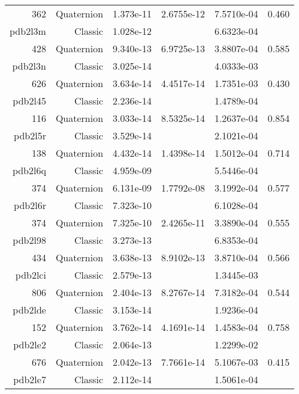 \begin{xltabular}{\textwidth}{r|rS[table-format=1.3e+2]S[table-format=1.4e+2]S[table-format=1.4e+2]S[table-format=-1.3]}
362 & Quaternion & 1.373e-11 & 2.6755e-12 & 7.5710e-04 & 0.460\\  \addlinespace
{\color{red} pdb2l3m } & Classic & 1.028e-12 &  & 6.6323e-04 & \\
428 & Quaternion & 9.340e-13 & 6.9725e-13 & 3.8807e-04 & 0.585\\  \addlinespace
{\color{red} pdb2l3n } & Classic & 3.025e-14 &  & 4.0333e-03 & \\
626 & Quaternion & 3.634e-14 & 4.4517e-14 & 1.7351e-03 & 0.430\\  \addlinespace
{\color{red} pdb2l45 } & Classic & 2.236e-14 &  & 1.4789e-04 & \\
116 & Quaternion & 3.033e-14 & 8.5325e-14 & 1.2637e-04 & 0.854\\  \addlinespace
{\color{red} pdb2l5r } & Classic & 3.529e-14 &  & 2.1021e-04 & \\
138 & Quaternion & 4.432e-14 & 1.4398e-14 & 1.5012e-04 & 0.714\\  \addlinespace
{\color{red} pdb2l6q } & Classic & 4.959e-09 &  & 5.5446e-04 & \\
374 & Quaternion & 6.131e-09 & 1.7792e-08 & 3.1992e-04 & 0.577\\  \addlinespace
{\color{red} pdb2l6r } & Classic & 7.323e-10 &  & 6.1028e-04 & \\
374 & Quaternion & 7.325e-10 & 2.4265e-11 & 3.3890e-04 & 0.555\\  \addlinespace
{\color{red} pdb2l98 } & Classic & 3.273e-13 &  & 6.8353e-04 & \\
434 & Quaternion & 3.638e-13 & 8.9102e-13 & 3.8710e-04 & 0.566\\  \addlinespace
{\color{red} pdb2lci } & Classic & 2.579e-13 &  & 1.3445e-03 & \\
806 & Quaternion & 2.404e-13 & 8.2767e-14 & 7.3182e-04 & 0.544\\  \addlinespace
{\color{red} pdb2lde } & Classic & 3.153e-14 &  & 1.9236e-04 & \\
152 & Quaternion & 3.762e-14 & 4.1691e-14 & 1.4583e-04 & 0.758\\  \addlinespace
{\color{red} pdb2le2 } & Classic & 2.064e-13 &  & 1.2299e-02 & \\
676 & Quaternion & 2.042e-13 & 7.7661e-14 & 5.1067e-03 & 0.415\\  \addlinespace
{\color{red} pdb2le7 } & Classic & 2.112e-14 &  & 1.5061e-04 & \\

\end{xltabular}
